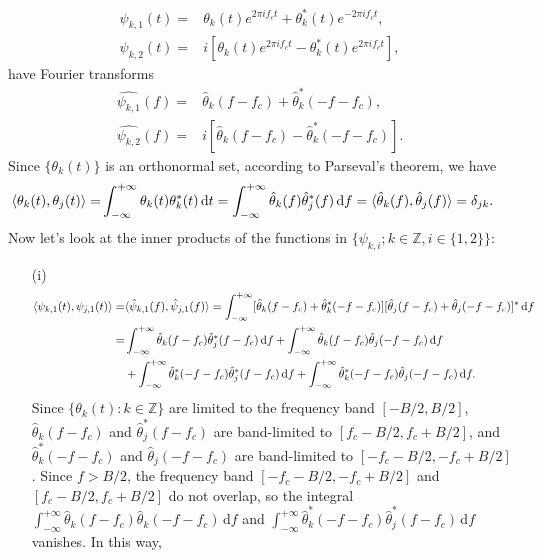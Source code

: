 \documentclass{assignment}
\begin{document}
\begin{sol}
    \begin{align}
        \psi_{k,1}(t)=&\theta_k(t)e^{2\pi if_ct}+\theta_k^*(t)e^{-2\pi if_ct},\\
        \psi_{k,2}(t)=&i[\theta_k(t)e^{2\pi if_ct}-\theta_k^*(t)e^{2\pi if_ct}],
    \end{align}
    have Fourier transforms
    \begin{align}
        \hat{\psi_{k,1}}(f)=&\hat{\theta}_k(f-f_c)+\hat{\theta}_k^*(-f-f_c),\\
        \hat{\psi_{k,2}}(f)=&i[\hat{\theta}_k(f-f_c)-\hat{\theta}_k^*(-f-f_c)].
    \end{align}
    Since $\{\theta_k(t)\}$ is an orthonormal set, according to Parseval's theorem, we have
    \begin{align}
        \notag\langle\theta_k(t),\theta_j(t)\rangle=&\int_{-\infty}^{+\infty}\theta_k(t)\theta_k^*(t)\,\mathrm{d}t=\int_{-\infty}^{+\infty}\hat{\theta}_k(f)\hat{\theta}_j^*(f)\,\mathrm{d}f=\langle\hat{\theta}_k(f),\hat{\theta}_j(f)\rangle=\delta_{jk}.
    \end{align}
    Now let's look at the inner products of the functions in $\{\psi_{k,i};k\in\mathbb{Z},i\in\{1,2\}\}$:
    \begin{itemize}
        \item[(i)] 
        \begin{align}
            \notag\langle\psi_{k,1}(t),\psi_{j,1}(t)\rangle=&\langle\hat{\psi}_{k,1}(f),\hat{\psi}_{j,1}(f)\rangle=\int_{-\infty}^{+\infty}[\hat{\theta}_k(f-f_c)+\hat{\theta}_k^*(-f-f_c)][\hat{\theta}_j(f-f_c)+\hat{\theta}_j(-f-f_c)]^*\,\mathrm{d}f\\
            \notag=&\int_{-\infty}^{+\infty}\hat{\theta}_k(f-f_c)\hat{\theta}_j^*(f-f_c)\,\mathrm{d}f+\int_{-\infty}^{+\infty}\hat{\theta}_k(f-f_c)\hat{\theta}_j(-f-f_c)\,\mathrm{d}f\\
            &+\int_{-\infty}^{+\infty}\hat{\theta}_k^*(-f-f_c)\hat{\theta}_j^*(f-f_c)\,\mathrm{d}f+\int_{-\infty}^{+\infty}\hat{\theta}_k^*(-f-f_c)\hat{\theta}_j(-f-f_c)\,\mathrm{d}f.
        \end{align}
        Since $\{\theta_k(t):k\in\mathbb{Z}\}$ are limited to the frequency band $[-B/2,B/2]$, $\hat{\theta}_k(f-f_c)$ and $\hat{\theta}_j^*(f-f_c)$ are band-limited to $[f_c-B/2,f_c+B/2]$, and $\hat{\theta}_k^*(-f-f_c)$ and $\hat{\theta}_j(-f-f_c)$ are band-limited to $[-f_c-B/2,-f_c+B/2]$. Since $f>B/2$, the frequency band $[-f_c-B/2,-f_c+B/2]$ and $[f_c-B/2,f_c+B/2]$ do not overlap, so the integral $\int_{-\infty}^{+\infty}\hat{\theta}_k(f-f_c)\hat{\theta}_k(-f-f_c)\,\mathrm{d}f$ and $\int_{-\infty}^{+\infty}\hat{\theta}_k^*(-f-f_c)\hat{\theta}_j^*(f-f_c)\,\mathrm{d}f$ vanishes. In this way,

\end{itemize}
\end{sol}
\end{document}
